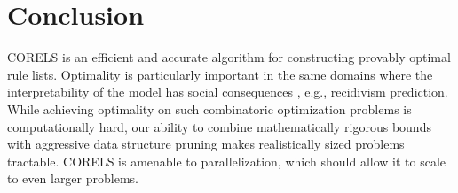\section{Conclusion}

CORELS is an efficient and accurate algorithm for constructing provably
optimal rule lists.
Optimality is particularly important in the same domains where the
interpretability of the model has social consequences , e.g., recidivism
prediction.
While achieving optimality on such combinatoric optimization problems is
computationally hard, our ability to combine mathematically rigorous bounds
with aggressive data structure pruning makes realistically sized problems
tractable.
CORELS is amenable to parallelization, which should allow it to scale to
even larger problems.

